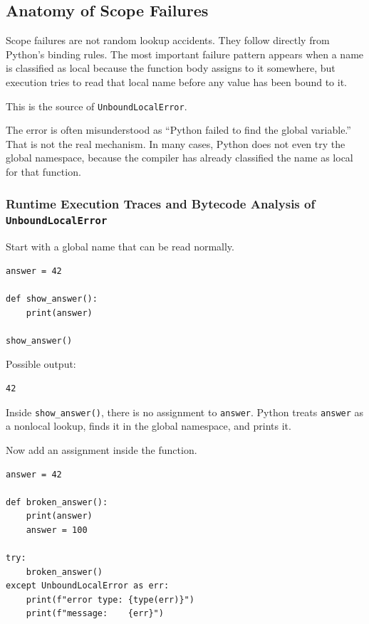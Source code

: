 \subsection{Anatomy of Scope Failures}

Scope failures are not random lookup accidents. They follow directly from Python's binding rules. The most important failure pattern appears when a name is classified as local because the function body assigns to it somewhere, but execution tries to read that local name before any value has been bound to it.

This is the source of \texttt{UnboundLocalError}.

The error is often misunderstood as ``Python failed to find the global variable.'' That is not the real mechanism. In many cases, Python does not even try the global namespace, because the compiler has already classified the name as local for that function.

\subsubsection{Runtime Execution Traces and Bytecode Analysis of \texttt{UnboundLocalError}}

Start with a global name that can be read normally.

\begin{verbatim}
answer = 42

def show_answer():
    print(answer)

show_answer()
\end{verbatim}

Possible output:

\begin{verbatim}
42
\end{verbatim}

Inside \texttt{show\_answer()}, there is no assignment to \texttt{answer}. Python treats \texttt{answer} as a nonlocal lookup, finds it in the global namespace, and prints it.

Now add an assignment inside the function.

\begin{verbatim}
answer = 42

def broken_answer():
    print(answer)
    answer = 100

try:
    broken_answer()
except UnboundLocalError as err:
    print(f"error type: {type(err)}")
    print(f"message:    {err}")
\end{verbatim}

